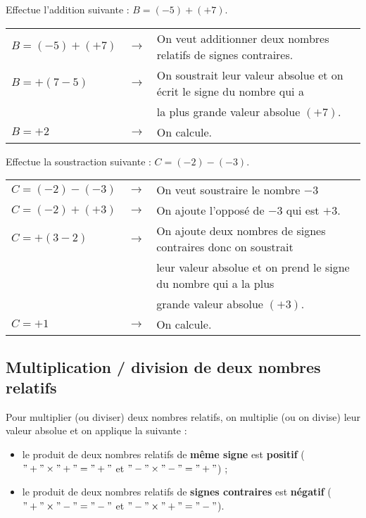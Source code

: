 \begin{exemple*1}
Effectue l'addition suivante : $B = (-5) +(+7)$.  

\correction

\begin{tabular}{lcl}
$B = (-5) +(+7)$ & $\rightarrow$ & On veut additionner deux nombres relatifs de signes contraires. \\
$B = +(7 -5)$ & $\rightarrow$ & On soustrait leur valeur absolue et on écrit le signe du nombre qui a \\
& & la plus grande valeur absolue $(+7)$. \\
$B = +2$ & $\rightarrow$ & On calcule. \\
\end{tabular}

\end{exemple*1}





\begin{exemple*1}
Effectue la soustraction suivante : $C = (-2) -(-3)$. 

\correction

\begin{tabular}{lcl}
$C = (-2) -(-3)$ & $\rightarrow$ &  On veut soustraire le nombre $-3$\\
$C = (-2) +(+3)$ & $\rightarrow$ &  On ajoute l'opposé de $-3$ qui est $+3$.\\
$C = +(3 -2)$ & $\rightarrow$ &  On ajoute deux nombres de signes contraires donc on soustrait \\
& & leur valeur absolue et on prend le signe du nombre qui a la plus \\
& & grande valeur absolue $(+3)$. \\
$C = +1$ & $\rightarrow$ &  On calcule.\\
\end{tabular}

\end{exemple*1}
 



\subsection{Multiplication / division de deux nombres relatifs}

\begin{aconnaitre}
Pour multiplier (ou diviser) deux nombres relatifs, on multiplie (ou on divise) leur valeur absolue et on applique la  suivante :
\begin{itemize}
    \item le produit de deux nombres relatifs de \textbf{même signe} est \textbf{positif} ($"+" \times "+" = "+"$ et $"-" \times "-" = "+"$) ;
    \item le produit de deux nombres relatifs de \textbf{signes contraires} est \textbf{négatif} ($"+" \times "-" = "-"$ et $"-" \times "+" = "-"$).
\end{itemize}
\end{aconnaitre}	





